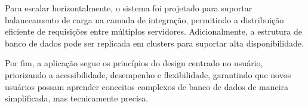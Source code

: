 Para escalar horizontalmente, o sistema foi projetado para suportar balanceamento de carga na camada de integração, permitindo a distribuição eficiente de requisições entre múltiplos servidores. Adicionalmente, a estrutura de banco de dados pode ser replicada em clusters para suportar alta disponibilidade.

Por fim, a aplicação segue os princípios do design centrado no usuário, priorizando a acessibilidade, desempenho e flexibilidade, garantindo que novos usuários possam aprender conceitos complexos de banco de dados de maneira simplificada, mas tecnicamente precisa.


